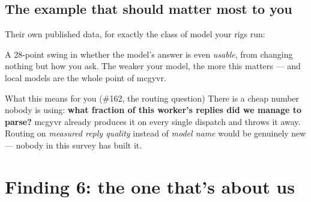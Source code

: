 \documentclass[11pt]{article}
\newcommand{\shout}[1]{\textbf{#1}}
\begin{document}
\subsection*{The example that should matter most to you}

Their own published data, for exactly the class of model your rigs run:

\begin{center}
\end{center}

A 28-point swing in whether the model's answer is even \emph{usable}, from
changing nothing but how you ask. The weaker your model, the more this matters ---
and local models are the whole point of mcgyvr.

\begin{keybox}{What this means for you (\#162, the routing question)}
There is a cheap number nobody is using: \shout{what fraction of this worker's
replies did we manage to parse?} mcgyvr already produces it on every single
dispatch and throws it away. Routing on \emph{measured reply quality} instead of
\emph{model name} would be genuinely new --- nobody in this survey has built it.
\end{keybox}

\newpage
\section{Finding 6: the one that's about us}
\end{document}
